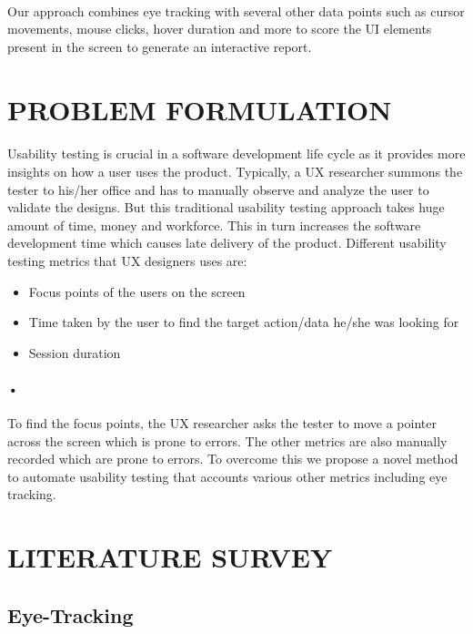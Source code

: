 \documentclass[a4paper,12pt,oneside]{article}
\begin{document}
\paragraph{}
Our approach combines eye tracking with several other data points such as cursor movements, mouse clicks, hover duration and more to score the UI elements present in the screen to generate an interactive report.

\newpage
\section{PROBLEM FORMULATION}
\paragraph{}
Usability testing is crucial in a software development life cycle as it provides more insights on how a user uses the product. Typically, a UX researcher summons the tester to his/her office and has to manually observe and analyze the user to validate the designs. But this traditional usability testing approach takes huge amount of time, money and workforce. This in turn increases the software development time which causes late delivery of the product. 
Different usability testing metrics that UX designers uses are: 
\begin{itemize}
\item Focus points of the users on the screen
\item Time taken by the user to find the target action/data he/she was looking for
\item Session duration
\end{itemize}
\paragraph{•}
To find the focus points, the UX researcher asks the tester to move a pointer across the screen which is prone to errors. The other metrics are also manually recorded which are prone to errors. To overcome this we propose a novel method to automate usability testing that accounts various other metrics including eye tracking.





\newpage
\section{LITERATURE SURVEY}
\subsection{Eye-Tracking}
    
\end{document}
